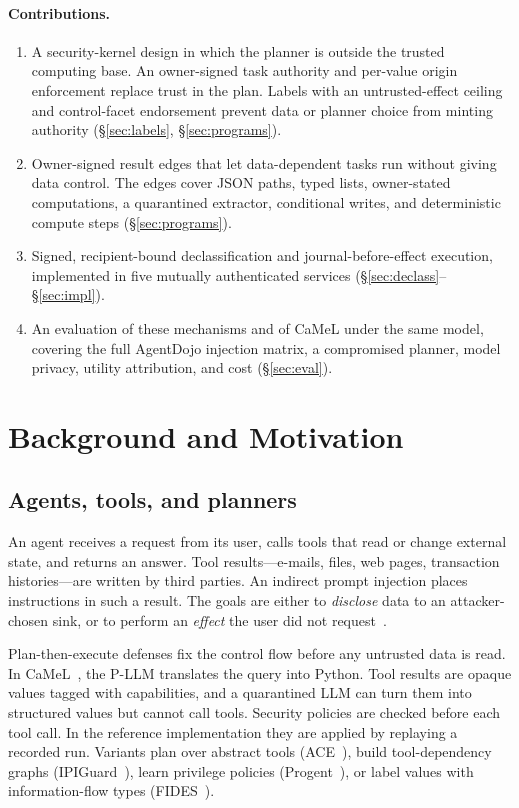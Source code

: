 \documentclass[letterpaper,twocolumn,10pt]{article}
\begin{document}
\paragraph{Contributions.}
\begin{enumerate}
\item A security-kernel design in which the planner is outside the trusted
  computing base. An owner-signed task authority and per-value origin
  enforcement replace trust in the plan. Labels with an untrusted-effect
  ceiling and control-facet endorsement prevent data or planner choice
  from minting authority (\S\ref{sec:labels}, \S\ref{sec:programs}).
\item Owner-signed result edges that let data-dependent tasks run without
  giving data control. The edges cover JSON paths, typed lists,
  owner-stated computations, a quarantined extractor, conditional writes,
  and deterministic compute steps (\S\ref{sec:programs}).
\item Signed, recipient-bound declassification and journal-before-effect
  execution, implemented in five mutually authenticated services
  (\S\ref{sec:declass}--\S\ref{sec:impl}).
\item An evaluation of these mechanisms and of CaMeL under the same model,
  covering the full AgentDojo injection matrix, a compromised planner, model
  privacy, utility attribution, and cost (\S\ref{sec:eval}).
\end{enumerate}

\section{Background and Motivation}
\label{sec:background}

\subsection{Agents, tools, and planners}

An agent receives a request from its user, calls tools that read or change
external state, and returns an answer. Tool results---e-mails, files, web
pages, transaction histories---are written by third parties. An indirect
prompt injection places instructions in such a result. The goals are either
to \emph{disclose} data to an attacker-chosen sink, or to perform an
\emph{effect} the user did not request~\cite{greshake2023,debenedetti2024agentdojo}.

Plan-then-execute defenses fix the control flow before any untrusted data
is read. In CaMeL~\cite{debenedetti2025camel}, the P-LLM translates the
query into Python. Tool results are opaque values tagged with
capabilities, and a quarantined LLM can turn them into structured values
but cannot call tools. Security policies are checked before each tool
call. In the reference implementation they are applied by replaying a
recorded run. Variants plan over abstract tools (ACE~\cite{ace2026}),
build tool-dependency graphs (IPIGuard~\cite{ipiguard2025}), learn
privilege policies (Progent~\cite{shi2025progent}), or label values with
information-flow types (FIDES~\cite{costa2025fides}).
\end{document}
